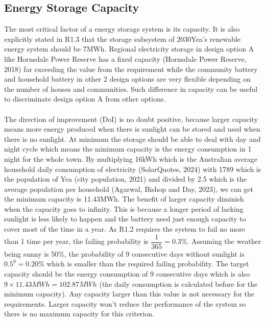 \documentclass{article}
\begin{document}
\subsection{Energy Storage Capacity}
The most critical factor of a energy storage system is its capacity. It is also explicitly stated in R1.3 that the storage subsystem of 2030Yea's renewable energy system should be 7MWh. Regional electricity storage in design option A like Hornsdale Power Reserve has a fixed capacity (Hornsdale Power Reserve, 2018) far exceeding the value from the requirement while the community battery and household battery in other 2 design options are very flexible depending on the number of houses and communities. Such difference in capacity can be useful to discriminate design option A from other options.\\
\\
The direction of improvement (DoI) is no doubt positive, because larger capacity means more energy produced when there is sunlight can be stored and used when there is no sunlight. At minimum the storage should be able to deal with day and night cycle which means the minimum capacity is the energy consumption in 1 night for the whole town. By multiplying 16kWh which is the Australian average household daily consumption of electricity (SolarQuotes, 2024) with 1789 which is the population of Yea (city population, 2021) and divided by 2.5 which is the average population per household  (Agarwal, Bishop and Day, 2023), we can get the minimum capacity is 11.43MWh. The benefit of larger capacity diminish when the capacity goes to infinity. This is because a longer period of lacking sunlight is less likely to happen and the battery need just enough capacity to cover most of the time in a year. As R1.2 requires the system to fail no more than 1 time per year, the failing probability is \(\dfrac{1}{365}=0.3\%\). Assuming the weather being sunny is 50\%, the probability of 9 consecutive days without sunlight is \(0.5^9=0.20\%\) which is smaller than the required failing probability. The target capacity should be the energy consumption of 9 consecutive days which is also \(9\times 11.43MWh=102.87MWh\) (the daily consumption is calculated before for the minimum capacity). Any capacity larger than this value is not necessary for the requirements. Larger capacity won't reduce the performance of the system so there is no maximum capacity for this criterion.
\end{document}
